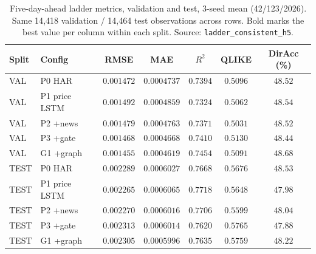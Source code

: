 \documentclass[runningheads]{llncs}
\newcommand{\nval}{14{,}418}
\newcommand{\ntest}{14{,}464}
\newcommand{\nseed}{3}
\begin{document}
\begin{table}[t]
\caption{Five-day-ahead ladder metrics, validation and test, \nseed-seed mean (42/123/2026). Same \nval{}
validation / \ntest{} test observations across rows. Bold marks the best value per column within each
split. Source: \texttt{ladder\_consistent\_h5}.}
\label{tab:ladder}
\centering
\begin{tabular}{llccccc}
\toprule
Split & Config & RMSE & MAE & $R^2$ & QLIKE & DirAcc (\%) \\
\midrule
VAL  & P0 HAR         & $0.001472$          & $0.0004737$          & $0.7394$          & $0.5096$          & $48.52$ \\
VAL  & P1 price LSTM  & $0.001492$          & $0.0004859$          & $0.7324$          & $0.5062$          & $48.54$ \\
VAL  & P2 +news       & $0.001479$          & $0.0004763$          & $0.7371$          & $\mathbf{0.5031}$ & $48.52$ \\
VAL  & P3 +gate       & $0.001468$          & $0.0004668$          & $0.7410$          & $0.5130$          & $48.44$ \\
VAL  & G1 +graph      & $\mathbf{0.001455}$ & $\mathbf{0.0004619}$ & $\mathbf{0.7454}$ & $0.5091$          & $\mathbf{48.68}$ \\
\midrule
TEST & P0 HAR         & $0.002289$          & $0.0006027$          & $0.7668$          & $0.5676$          & $\mathbf{48.53}$ \\
TEST & P1 price LSTM  & $\mathbf{0.002265}$ & $0.0006065$          & $\mathbf{0.7718}$ & $0.5648$          & $47.98$ \\
TEST & P2 +news       & $0.002270$          & $0.0006016$          & $0.7706$          & $\mathbf{0.5599}$ & $48.04$ \\
TEST & P3 +gate       & $0.002313$          & $0.0006014$          & $0.7620$          & $0.5765$          & $47.88$ \\
TEST & G1 +graph      & $0.002305$          & $\mathbf{0.0005996}$ & $0.7635$          & $0.5759$          & $48.22$ \\
\bottomrule
\end{tabular}
\end{table}
\end{document}
